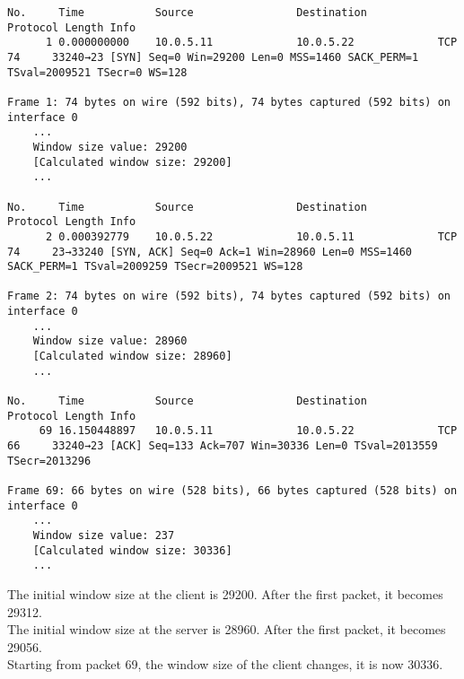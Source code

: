 \begin{verbatim}
No.     Time           Source                Destination           Protocol Length Info
      1 0.000000000    10.0.5.11             10.0.5.22             TCP      74     33240→23 [SYN] Seq=0 Win=29200 Len=0 MSS=1460 SACK_PERM=1 TSval=2009521 TSecr=0 WS=128

Frame 1: 74 bytes on wire (592 bits), 74 bytes captured (592 bits) on interface 0
    ...
    Window size value: 29200
    [Calculated window size: 29200]
    ...

No.     Time           Source                Destination           Protocol Length Info
      2 0.000392779    10.0.5.22             10.0.5.11             TCP      74     23→33240 [SYN, ACK] Seq=0 Ack=1 Win=28960 Len=0 MSS=1460 SACK_PERM=1 TSval=2009259 TSecr=2009521 WS=128

Frame 2: 74 bytes on wire (592 bits), 74 bytes captured (592 bits) on interface 0
    ...
    Window size value: 28960
    [Calculated window size: 28960]
    ...

No.     Time           Source                Destination           Protocol Length Info
     69 16.150448897   10.0.5.11             10.0.5.22             TCP      66     33240→23 [ACK] Seq=133 Ack=707 Win=30336 Len=0 TSval=2013559 TSecr=2013296

Frame 69: 66 bytes on wire (528 bits), 66 bytes captured (528 bits) on interface 0
    ...
    Window size value: 237
    [Calculated window size: 30336]
    ...
\end{verbatim}

The initial window size at the client is 29200. After the first packet, it becomes 29312. \\
The initial window size at the server is 28960. After the first packet, it becomes 29056. \\
Starting from packet 69, the window size of the client changes, it is now 30336.